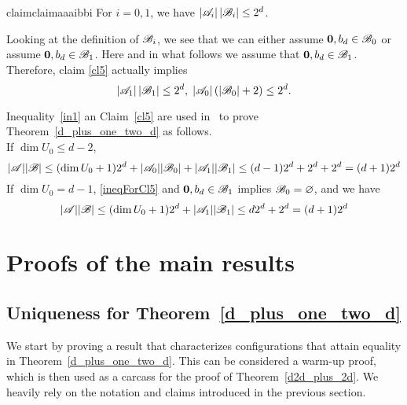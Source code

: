 \begin{restatable}{claim}{claimaaaibbi}\label{cl5}
    For $i=0, 1$, we have $\left|{\mathscr{A}}_i\right|\left|{\mathscr{B}}_i\right| \leq 2^d$.
\end{restatable}


\noindent Looking at the definition of ${\mathscr{B}}_i$, we see that we can either assume  $\mathbf{0}, b_d \in {\mathscr{B}}_0$ or assume $\mathbf{0}, b_d \in {\mathscr{B}}_1$. Here and in what follows we assume that $\mathbf{0}, b_d \in {\mathscr{B}}_1$. Therefore, claim \ref{cl5} actually implies
\begin{equation}\label{stronger5}
    \left|{\mathscr{A}}_1\right|\left|{\mathscr{B}}_1\right| \leq 2^d,\; \left|{\mathscr{A}}_0\right|\left(\left|{\mathscr{B}}_0\right|+2\right)\leq 2^d.
\end{equation}

\noindent Inequality~\ref{in1} an Claim~\ref{cl5} are used in~\cite{kupavskii22} to prove Theorem~\ref{d_plus_one_two_d} as follows.\\ 
If $\operatorname{dim}U_0 \leq d-2$, 
\begin{equation}\label{final-old-step-smalldim}
    |{\mathscr{A}}| |{\mathscr{B}}| \leq (\operatorname{dim}U_0 + 1)2^d + |{\mathscr{A}}_0||{\mathscr{B}}_0|+|{\mathscr{A}}_1||{\mathscr{B}}_1| \leq (d-1)2^d + 2^d + 2^d = (d+1)2^d
\end{equation}
If $\operatorname{dim}U_0 = d-1$, \eqref{ineqForCl5} and $\mathbf{0}, b_d \in {\mathscr{B}}_1$ implies ${\mathscr{B}}_0 = \varnothing$, and we have
\begin{equation}\label{final-old-step-d-1}
    |{\mathscr{A}}| |{\mathscr{B}}| \leq (\operatorname{dim}U_0 + 1)2^d + |{\mathscr{A}}_1||{\mathscr{B}}_1| \leq d 2^d + 2^d = (d+1)2^d
\end{equation}

\section{Proofs of the main results}
\subsection{Uniqueness for Theorem~\ref{d_plus_one_two_d}}\label{sec31}

We start by proving a result that characterizes configurations that attain equality  in Theorem~\ref{d_plus_one_two_d}. This can be considered a warm-up proof, which is then used as a carcass for the proof of Theorem~\ref{d2d_plus_2d}. We heavily rely on the notation and claims introduced in the previous section.

